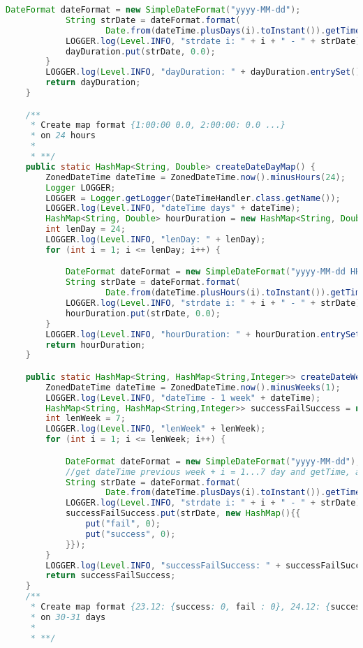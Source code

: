 \begin{lstlisting}[language=Java]
            DateFormat dateFormat = new SimpleDateFormat("yyyy-MM-dd");
            String strDate = dateFormat.format(
                    Date.from(dateTime.plusDays(i).toInstant()).getTime());
            LOGGER.log(Level.INFO, "strdate i: " + i + " - " + strDate);
            dayDuration.put(strDate, 0.0);
        }
        LOGGER.log(Level.INFO, "dayDuration: " + dayDuration.entrySet());
        return dayDuration;
    }

    /**
     * Create map format {1:00:00 0.0, 2:00:00: 0.0 ...}
     * on 24 hours
     *
     * **/
    public static HashMap<String, Double> createDateDayMap() {
        ZonedDateTime dateTime = ZonedDateTime.now().minusHours(24);
        Logger LOGGER;
        LOGGER = Logger.getLogger(DateTimeHandler.class.getName());
        LOGGER.log(Level.INFO, "dateTime days" + dateTime);
        HashMap<String, Double> hourDuration = new HashMap<String, Double>();
        int lenDay = 24;
        LOGGER.log(Level.INFO, "lenDay: " + lenDay);
        for (int i = 1; i <= lenDay; i++) {

            DateFormat dateFormat = new SimpleDateFormat("yyyy-MM-dd HH");
            String strDate = dateFormat.format(
                    Date.from(dateTime.plusHours(i).toInstant()).getTime());
            LOGGER.log(Level.INFO, "strdate i: " + i + " - " + strDate);
            hourDuration.put(strDate, 0.0);
        }
        LOGGER.log(Level.INFO, "hourDuration: " + hourDuration.entrySet());
        return hourDuration;
    }

    public static HashMap<String, HashMap<String,Integer>> createDateWeekMapSuccessRate() {
        ZonedDateTime dateTime = ZonedDateTime.now().minusWeeks(1);
        LOGGER.log(Level.INFO, "dateTime - 1 week" + dateTime);
        HashMap<String, HashMap<String,Integer>> successFailSuccess = new HashMap();
        int lenWeek = 7;
        LOGGER.log(Level.INFO, "lenWeek" + lenWeek);
        for (int i = 1; i <= lenWeek; i++) {

            DateFormat dateFormat = new SimpleDateFormat("yyyy-MM-dd");
            //get dateTime previous week + i = 1...7 day and getTime, after in strDate=2022-03-22
            String strDate = dateFormat.format(
                    Date.from(dateTime.plusDays(i).toInstant()).getTime());
            LOGGER.log(Level.INFO, "strdate i: " + i + " - " + strDate);
            successFailSuccess.put(strDate, new HashMap(){{
                put("fail", 0);
                put("success", 0);
            }});
        }
        LOGGER.log(Level.INFO, "successFailSuccess: " + successFailSuccess.entrySet());
        return successFailSuccess;
    }
    /**
     * Create map format {23.12: {success: 0, fail : 0}, 24.12: {success: 0, fail : 0} ...}
     * on 30-31 days
     *
     * **/


\end{lstlisting}
